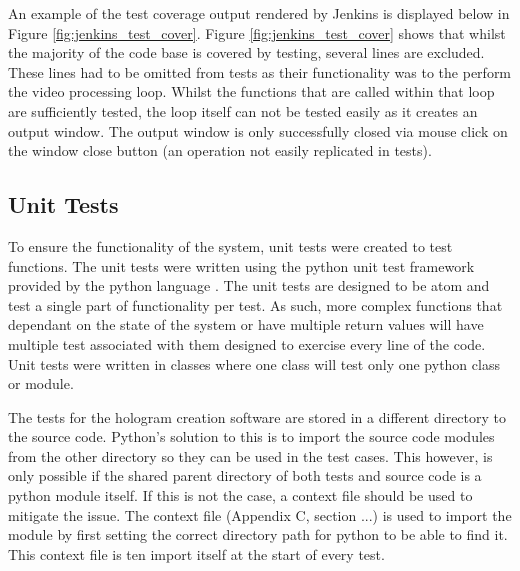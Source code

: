 An example of the test coverage output rendered by Jenkins is displayed below in Figure \ref{fig:jenkins_test_cover}. Figure \ref{fig:jenkins_test_cover} shows that whilst the majority of the code base is covered by testing, several lines are excluded. These lines had to be omitted from tests as their functionality was to the perform the video processing loop. Whilst the functions that are called within that loop are sufficiently tested, the loop itself can not be tested easily as it creates an output window. The output window is only successfully closed via mouse click on the window close button (an operation not easily replicated in tests).
\begin{figure}[h!]
\end{figure}
 

\subsection{Unit Tests}
To ensure the functionality of the system, unit tests were created to test functions. The unit tests were written using the python unit test framework provided by the python language \cite{python_unittest}. The unit tests are designed to be atom and test a single part of functionality per test. As such, more complex functions that dependant on the state of the system or have multiple return values will have multiple test associated with them designed to exercise every line of the code. Unit tests were written in classes where one class will test only one python class or module.

The tests for the hologram creation software are stored in a different directory to the source code. Python's solution to this is to import the source code modules from the other directory so they can be used in the test cases. This however, is only possible if the shared parent directory of both tests and source code is a python module itself. If this is not the case, a context file should be used to mitigate the issue. The context file (Appendix C, section ...) is used to import the module by first setting the correct directory path for python to be able to find it. This context file is ten import itself at the start of every test.

